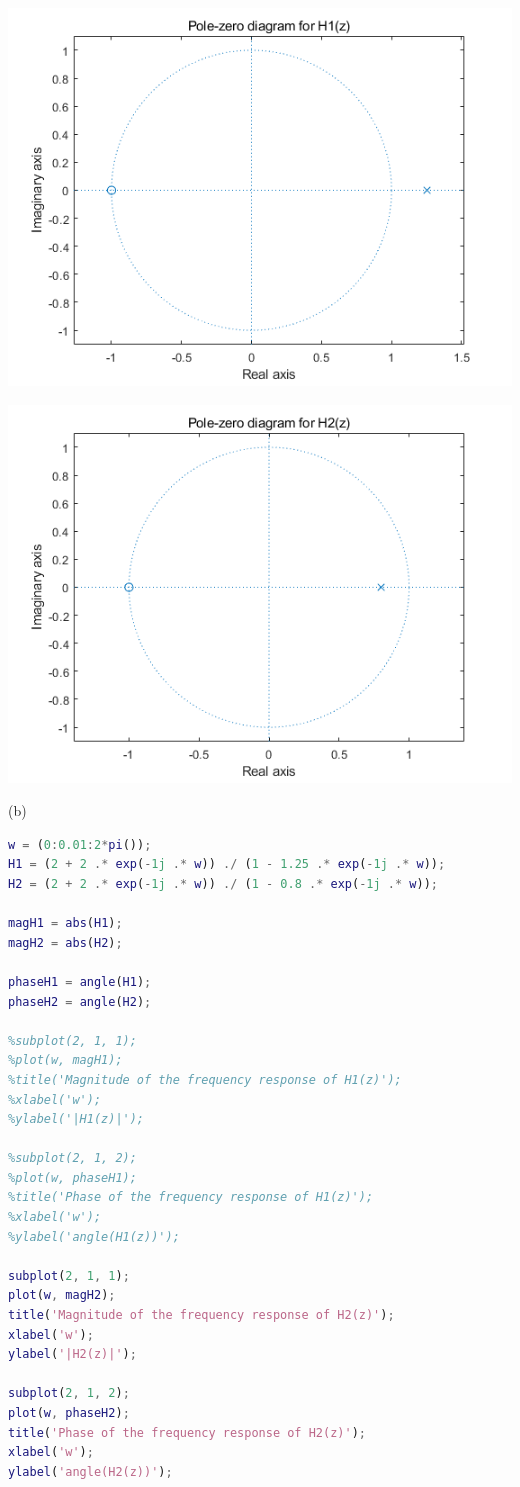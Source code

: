 \documentclass{article}
\begin{document}
\includegraphics[width=\textwidth]{QuestionTwoA1.png}

\includegraphics[width=\textwidth]{QuestionTwoA2.png}

(b) \begin{lstlisting}[language=matlab]
w = (0:0.01:2*pi());
H1 = (2 + 2 .* exp(-1j .* w)) ./ (1 - 1.25 .* exp(-1j .* w));
H2 = (2 + 2 .* exp(-1j .* w)) ./ (1 - 0.8 .* exp(-1j .* w));

magH1 = abs(H1);
magH2 = abs(H2);

phaseH1 = angle(H1);
phaseH2 = angle(H2);

%subplot(2, 1, 1);
%plot(w, magH1);
%title('Magnitude of the frequency response of H1(z)');
%xlabel('w');
%ylabel('|H1(z)|');

%subplot(2, 1, 2);
%plot(w, phaseH1);
%title('Phase of the frequency response of H1(z)');
%xlabel('w');
%ylabel('angle(H1(z))');

subplot(2, 1, 1);
plot(w, magH2);
title('Magnitude of the frequency response of H2(z)');
xlabel('w');
ylabel('|H2(z)|');

subplot(2, 1, 2);
plot(w, phaseH2);
title('Phase of the frequency response of H2(z)');
xlabel('w');
ylabel('angle(H2(z))');
\end{lstlisting}
\end{document}
